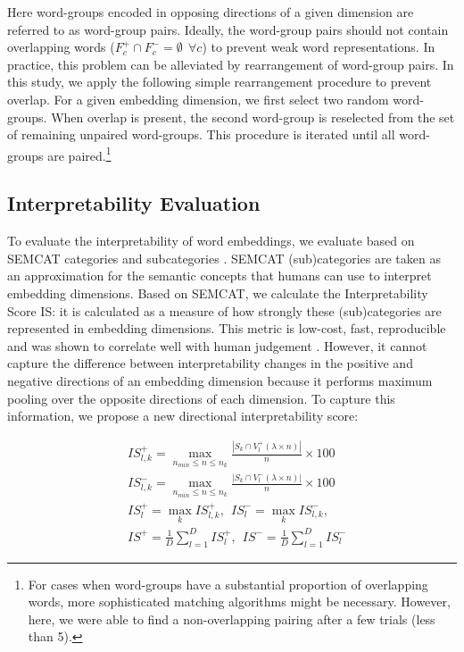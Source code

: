 \documentclass[11pt,a4paper]{article}
\begin{document}
Here word-groups encoded in opposing directions of a given
dimension are referred to as word-group pairs. Ideally, the
word-group pairs should not contain overlapping words
($F^+_c \cap F^-_c = \emptyset ~~\forall c$) to prevent weak
word representations. In practice, this problem can be
alleviated by rearrangement of word-group pairs. In this
study, we apply the following simple rearrangement procedure
to prevent overlap. For a given embedding dimension, we
first select two random word-groups. When overlap is
present, the second word-group is reselected from the set of
remaining unpaired word-groups. This procedure is iterated
until all word-groups are paired.\footnote{For cases when
  word-groups have a substantial proportion of overlapping
  words, more sophisticated matching algorithms might be
  necessary. However, here, we were able to find a
  non-overlapping pairing after a few trials (less than 5).}

\subsection{Interpretability Evaluation}
\label{sec:interp_eval}

To evaluate the interpretability of word embeddings,  we  evaluate based on SEMCAT categories
\citep{senel18semanticStructure} and subcategories
\citep{senel18trInterpret}. SEMCAT (sub)categories are taken
as an approximation for the semantic concepts that humans
can use to interpret embedding dimensions. Based on SEMCAT,
we calculate the Interpretability Score IS: it is
calculated as a measure of  how strongly these
(sub)categories are represented in embedding dimensions. This
metric is low-cost, fast, reproducible and was shown to correlate well with human judgement \citep{senel20impart}. However, it cannot capture the difference
between interpretability changes in the positive and
negative directions of an embedding dimension because it
performs maximum pooling over the opposite directions of
each dimension. To capture this information, we
propose a new directional interpretability score:

\begin{equation} \label{eq:interpretability_new}
\begin{split}
&IS^+_{l,k} = \max_{n_{min} \leq n \leq n_k } \frac{|S_k \cap V^+_l(\lambda \times n)|}{n} \times 100  \\
&IS^-_{l,k} = \max_{n_{min} \leq n \leq n_k } \frac{|S_k \cap V^-_l(\lambda \times n)|}{n} \times 100  \\
&IS^+_{l} = \max_{k} IS^+_{l,k}, ~~ IS^-_{l} = \max_{k} IS^-_{l,k},\\
&IS^+ = \frac{1}{D}\sum\limits_{l=1}^D IS^+_{l}, ~~ IS^- = \frac{1}{D}\sum\limits_{l=1}^D IS^-_{l}
\end{split}
\end{equation}
\end{document}
